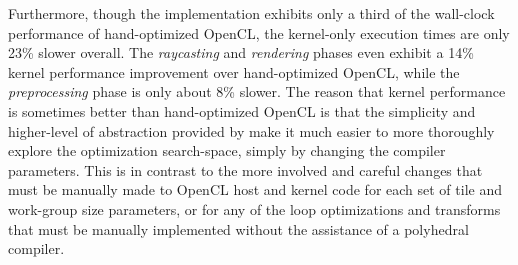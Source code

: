 \documentclass{llncs}
\begin{document}
\begin{table}[htbp]
\begin{center}
\end{center}
\vskip-0.1cm
\caption{Performance comparison of the PENCIL implementation of
         SLAMBench vs. hand-optimized OpenCL, on ARM Mali-T604.}
\label{SLAMBench_Speedups}
\vskip-0.1cm
\end{table}

Furthermore, though the \pencil implementation exhibits only a third
of the wall-clock performance of hand-optimized OpenCL, the kernel-only
execution times are only 23\% slower overall. The \textit{raycasting} and
\textit{rendering} phases even exhibit a 14\% kernel performance improvement
over hand-optimized OpenCL, while the \textit{preprocessing} phase is only
about 8\% slower.
The reason that kernel performance is sometimes better than hand-optimized
OpenCL is that the simplicity and higher-level of abstraction provided by
\pencil make it much easier to more thoroughly explore the optimization
search-space, simply by changing the \PPCG compiler parameters.
This is in contrast to the more involved and careful changes that must
be manually made to OpenCL host and kernel code for each set of tile
and work-group size parameters, or for any of the loop optimizations
and transforms that must be manually implemented without the assistance
of a polyhedral compiler.
\end{document}
